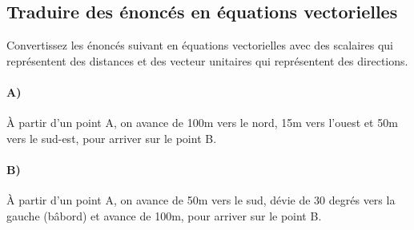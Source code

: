 %
%
%
%
%
%
%
%
%
%



\subsection{Traduire des énoncés en équations vectorielles}
\label{sec:exerposmaison}

Convertissez les énoncés suivant en équations vectorielles avec des scalaires qui représentent des distances et des vecteur unitaires qui représentent des directions. 

\paragraph{A)} 

À partir d'un point A, on avance de 100m vers le nord, 15m vers l'ouest et 50m vers le sud-est, pour arriver sur le point B.

\paragraph{B)} 

À partir d'un point A, on avance de 50m vers le sud, dévie de 30 degrés vers la gauche (bâbord) et avance de 100m, pour arriver sur le point B. 


